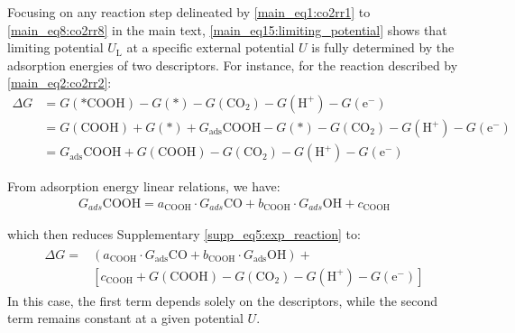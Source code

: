 \documentclass[a4paper, 12pt]{article}
\begin{document}
Focusing on any reaction step delineated by \cref{main_eq1:co2rr1} to \cref{main_eq8:co2rr8} in the main text,
\cref{main_eq15:limiting_potential} shows that limiting potential $U_{\mathrm{L}}$ at a specific external potential $U$ is fully determined by the adsorption energies of two descriptors.
For instance, for the reaction described by \cref{main_eq2:co2rr2}:
\begin{align}
  \Delta G &= G(\text{*COOH}) - G(\text{*}) - G(\text{CO}_2) - G(\text{H}^+) - G(\text{e}^-)  \\
  &= G(\text{COOH}) + G(\text{*}) + G_{\text{ads}}\text{COOH} -
  G(\text{*}) - G(\text{CO}_2) -G(\text{H}^+) - G(\text{e}^-) \\
  &= G_{\text{ads}}\text{COOH} + G(\text{COOH}) - G(\text{CO}_2) -G(\text{H}^+) - G(\text{e}^-)  \label{supp_eq5:exp_reaction}
\end{align}

From adsorption energy linear relations, we have:
\begin{align}
  G_{ads}{\mathrm{COOH}} = a_{\text{COOH}} \cdot G_{ads}{\mathrm{CO}} +
  b_{\text{COOH}} \cdot G_{ads}{\mathrm{OH}} + c_{\text{COOH}}  \label{supp_eq6:eads}
\end{align}

which then reduces Supplementary \cref{supp_eq5:exp_reaction} to:
\begin{align}
  \begin{split}
    \Delta G = &(a_{\text{COOH}} \cdot G_{\text{ads}}{\mathrm{CO}} +
    b_{\text{COOH}} \cdot G_{\text{ads}}{\mathrm{OH}}) + \\
    &[c_{\text{COOH}} + G(\mathrm{COOH}) -
    G(\mathrm{CO}_2) - G(\mathrm{H}^+) - G(\mathrm{e}^-)]  \label{supp_eq7:reduced_eads}
  \end{split}
\end{align}
In this case, the first term depends solely on the descriptors, while the second term remains constant at a given potential $U$.
\end{document}
